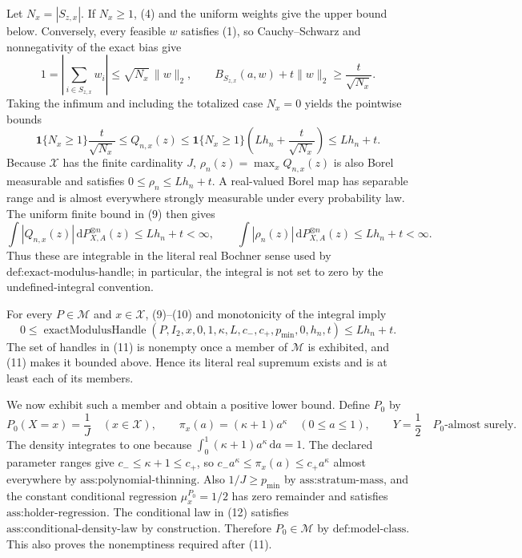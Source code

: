 Let \(N_x=|S_{z,x}|\).  If \(N_x\geq1\), (4) and the uniform weights give the upper bound below.  Conversely, every feasible \(w\) satisfies (1), so Cauchy--Schwarz and nonnegativity of the exact bias give
\[
1=\left|\sum_{i\in S_{z,x}}w_i\right|
\leq\sqrt{N_x}\,\|w\|_2,
\qquad
B_{S_{z,x}}(a,w)+t\|w\|_2\geq\frac{t}{\sqrt{N_x}}.
\tag{8}
\]
Taking the infimum and including the totalized case \(N_x=0\) yields the pointwise bounds
\[
\mathbf 1\{N_x\geq1\}\frac{t}{\sqrt{N_x}}
\leq Q_{n,x}(z)
\leq\mathbf 1\{N_x\geq1\}
\left(Lh_n+\frac{t}{\sqrt{N_x}}\right)
\leq Lh_n+t.
\tag{9}
\]
Because \(\mathcal X\) has the finite cardinality \(J\), \(\rho_n(z)=\max_xQ_{n,x}(z)\) is also Borel measurable and satisfies \(0\leq\rho_n\leq Lh_n+t\).  A real-valued Borel map has separable range and is almost everywhere strongly measurable under every probability law.  The uniform finite bound in (9) then gives
\[
\int |Q_{n,x}(z)|\,\mathrm dP_{X,A}^{\otimes n}(z)
\leq Lh_n+t<\infty,
\qquad
\int |\rho_n(z)|\,\mathrm dP_{X,A}^{\otimes n}(z)
\leq Lh_n+t<\infty.
\tag{10}
\]
Thus these are integrable in the literal real Bochner sense used by \(\text{def:exact-modulus-handle}\); in particular, the integral is not set to zero by the undefined-integral convention.

For every \(P\in\mathcal M\) and \(x\in\mathcal X\), (9)--(10) and monotonicity of the integral imply
\[
0\leq
\operatorname{exactModulusHandle}(P,I_2,x,0,1,\kappa,L,c_-,c_+,p_{\min},0,h_n,t)
\leq Lh_n+t.
\tag{11}
\]
The set of handles in (11) is nonempty once a member of \(\mathcal M\) is exhibited, and (11) makes it bounded above.  Hence its literal real supremum exists and is at least each of its members.

We now exhibit such a member and obtain a positive lower bound.  Define \(P_0\) by
\[
P_0(X=x)=\frac1J\quad(x\in\mathcal X),
\qquad
\pi_x(a)=(\kappa+1)a^\kappa\quad(0\leq a\leq1),
\qquad
Y=\frac12\quad P_0\text{-almost surely}.
\tag{12}
\]
The density integrates to one because \(\int_0^1(\kappa+1)a^\kappa\,\mathrm da=1\).  The declared parameter ranges give \(c_-\leq\kappa+1\leq c_+\), so \(c_-a^\kappa\leq\pi_x(a)\leq c_+a^\kappa\) almost everywhere by \(\text{ass:polynomial-thinning}\).  Also \(1/J\geq p_{\min}\) by \(\text{ass:stratum-mass}\), and the constant conditional regression \(\mu_x^{P_0}=1/2\) has zero remainder and satisfies \(\text{ass:holder-regression}\).  The conditional law in (12) satisfies \(\text{ass:conditional-density-law}\) by construction.  Therefore \(P_0\in\mathcal M\) by \(\text{def:model-class}\).  This also proves the nonemptiness required after (11).

